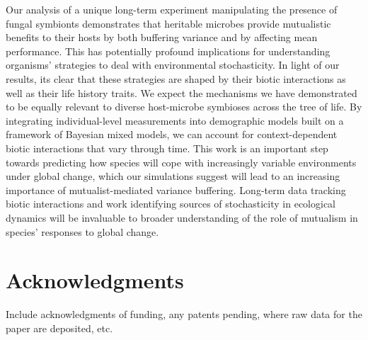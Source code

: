 \documentclass[12pt]{article}
\begin{document}
Our analysis of a unique long-term experiment manipulating the presence of fungal symbionts demonstrates that heritable microbes provide mutualistic benefits to their hosts by both buffering variance and by affecting mean performance. 
This has potentially profound implications for understanding organisms' strategies to deal with environmental stochasticity.
In light of our results, its clear that these strategies are shaped by their biotic interactions as well as their life history traits.  
We expect the mechanisms we have demonstrated to be equally relevant to diverse host-microbe symbioses across the tree of life.
By integrating individual-level measurements into demographic models built on a framework of Bayesian mixed models, we can account for context-dependent biotic interactions that vary through time.
This work is an important step towards predicting how species will cope with increasingly variable environments under global change, which our simulations suggest will lead to an increasing importance of mutualist-mediated variance buffering.
Long-term data tracking biotic interactions and work identifying sources of stochasticity in ecological dynamics will be invaluable to broader understanding of the role of mutualism in species' responses to global change. 















\section*{Acknowledgments}
Include acknowledgments of funding, any patents pending, where raw data for the paper are deposited, etc.

\end{document}
